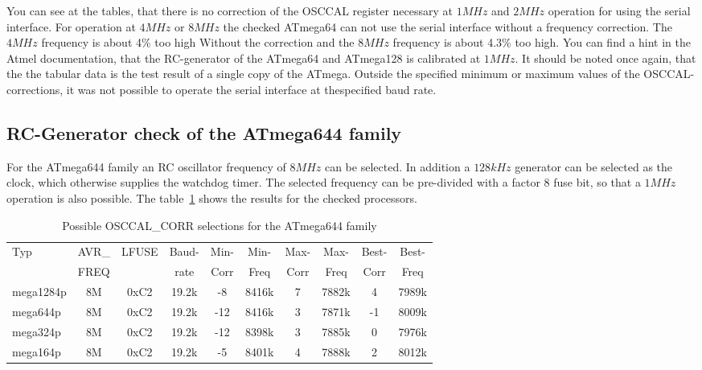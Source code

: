 You can see at the tables, that there is no correction of the OSCCAL register necessary 
at \(1MHz\) and \(2MHz\) operation for using the serial interface.
For operation at \(4MHz\) or \(8MHz\) the checked ATmega64 can not use
the serial interface without a frequency correction.
The \(4MHz\) frequency is about 4\% too high Without the correction and
the \(8MHz\) frequency is about 4.3\% too high.
You can find a hint in the Atmel documentation, that the RC-generator of the
ATmega64 and ATmega128 is calibrated at \(1MHz\).
It should be noted once again, that the the tabular data is the test result of a single copy
of the ATmega. Outside the specified minimum or maximum values of the OSCCAL-corrections,
it was not possible to operate the serial interface at thespecified baud rate.

\subsection{RC-Generator check of the ATmega644 family}

For the ATmega644 family an RC oscillator frequency of \(8MHz\) can be selected.
In addition a \(128kHz\) generator can be selected as the clock, which
otherwise supplies the watchdog timer.
The selected frequency can be pre-divided with a factor 8 fuse bit,
so that a \(1MHz\) operation is also possible.
The table~\ref{tab:mega644freq} shows the results for the checked processors.

\begin{table}[H]
  \begin{center}
    \begin{tabular}{| l | c | c | c || c | c || c | c || c | c |}
    \hline
   Typ  &       AVR\_ & LFUSE & Baud- & Min- & Min- & Max- & Max- & Best- & Best-  \\
        &       FREQ  &       & rate & Corr & Freq & Corr & Freq  & Corr  & Freq  \\
    \hline
    \hline
mega1284p &          8M & 0xC2  & 19.2k & -8  & 8416k & 7  & 7882k  & 4  & 7989k \\
    \hline
mega644p &          8M & 0xC2  & 19.2k &  -12 & 8416k & 3  & 7871k  & -1  & 8009k \\
    \hline
mega324p &          8M & 0xC2  & 19.2k &  -12 & 8398k & 3  & 7885k  & 0  & 7976k \\
    \hline
mega164p &          8M & 0xC2  & 19.2k &  -5  & 8401k & 4  & 7888k  & 2  & 8012k \\
    \hline
    \end{tabular}
  \end{center}
  \caption{Possible OSCCAL\_CORR selections for the ATmega644 family}
  \label{tab:mega644freq}
\end{table}

